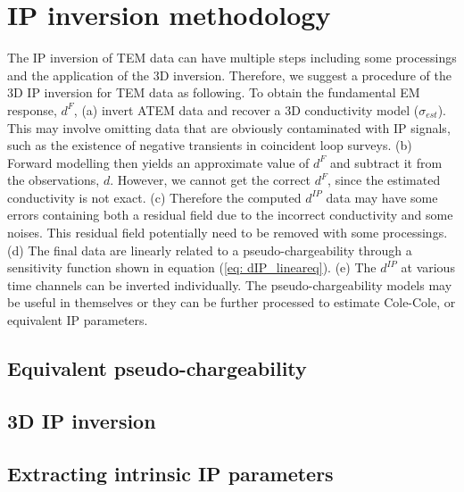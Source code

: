 \documentclass[a4paper, 11pt]{article}
\newcommand{\dip}{d^{IP}}
\begin{document}

\section{IP inversion methodology}
The IP inversion of TEM data can have multiple steps including some processings and the application of the 3D inversion. Therefore, we suggest a procedure of the 3D IP inversion for TEM data as following.
To obtain the fundamental EM response, $d^F$, (a) invert ATEM data and recover a 3D conductivity model ($\sigma_{est}$). 
This may involve omitting data that are obviously contaminated with IP signals, such as the existence of negative transients in coincident loop surveys. 
(b) Forward modelling then yields an approximate value of $d^F$ and subtract it from the observations, $d$. 
However, we cannot get the correct $d^F$, since the estimated conductivity is not exact. 
(c) Therefore the computed $\dip$ data may have some errors containing both a residual field due to the incorrect conductivity and some noises. This residual field potentially need to be removed with some processings. 
(d) The final data are linearly related to a pseudo-chargeability through a sensitivity function shown in equation (\ref{eq: dIP_lineareq}). 
(e) The $\dip$ at various time channels can be inverted individually. The pseudo-chargeability models may be useful in themselves or they can be further processed to estimate Cole-Cole, or equivalent IP parameters.

\subsection{Equivalent pseudo-chargeability}

\subsection{3D IP inversion}

\subsection{Extracting intrinsic IP parameters}

\end{document}
